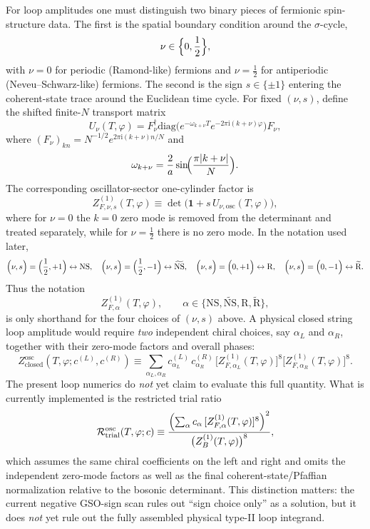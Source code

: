 \documentclass[11pt]{article}
\newcommand{\ii}{\mathrm{i}}
\begin{document}
For loop amplitudes one must distinguish two binary pieces of fermionic
spin-structure data. The first is the spatial boundary condition around the
$\sigma$-cycle,
\[
\nu\in\Bigl\{0,\frac12\Bigr\},
\]
with $\nu=0$ for periodic (Ramond-like) fermions and $\nu=\frac12$ for
antiperiodic (Neveu--Schwarz-like) fermions. The second is the sign
$s\in\{\pm1\}$ entering the coherent-state trace around the Euclidean time
cycle. For fixed $(\nu,s)$, define the shifted finite-$N$ transport matrix
\begin{equation}
U_\nu(T,\varphi)
=
F_\nu^\dagger
\mathrm{diag}\!\bigl(
e^{-\omega_{k+\nu}T}e^{-2\pi\ii(k+\nu)\varphi}
\bigr)
F_\nu,
\label{eq:ferm-spin-transport}
\end{equation}
where $(F_\nu)_{kn}=N^{-1/2}e^{2\pi\ii(k+\nu)n/N}$ and
\[
\omega_{k+\nu}=\frac{2}{a}\sin\!\Bigl(\frac{\pi|k+\nu|}{N}\Bigr).
\]
The corresponding oscillator-sector one-cylinder factor is
\begin{equation}
Z^{(1)}_{F,\nu,s}(T,\varphi)
\equiv
\det\!\bigl(\mathbf{1}+s\,U_{\nu,\mathrm{osc}}(T,\varphi)\bigr),
\label{eq:ferm-spin-sector}
\end{equation}
where for $\nu=0$ the $k=0$ zero mode is removed from the determinant and
treated separately, while for $\nu=\frac12$ there is no zero mode. In the
notation used later,
\[
\Bigl(\nu,s\Bigr)=\Bigl(\frac12,+1\Bigr)\leftrightarrow \mathrm{NS},\quad
\Bigl(\nu,s\Bigr)=\Bigl(\frac12,-1\Bigr)\leftrightarrow \widetilde{\mathrm{NS}},\quad
\Bigl(\nu,s\Bigr)=\Bigl(0,+1\Bigr)\leftrightarrow \mathrm{R},\quad
\Bigl(\nu,s\Bigr)=\Bigl(0,-1\Bigr)\leftrightarrow \widetilde{\mathrm{R}}.
\]
Thus the notation
\[
Z^{(1)}_{F,\alpha}(T,\varphi),
\qquad
\alpha\in\{\mathrm{NS},\widetilde{\mathrm{NS}},\mathrm{R},\widetilde{\mathrm{R}}\},
\]
is only shorthand for the four choices of $(\nu,s)$ above. A physical closed
string loop amplitude would require \emph{two} independent chiral choices,
say $\alpha_L$ and $\alpha_R$, together with their zero-mode factors and
overall phases:
\begin{equation}
Z_{\mathrm{closed}}^{\mathrm{osc}}(T,\varphi;c^{(L)},c^{(R)})
\equiv
\sum_{\alpha_L,\alpha_R}
c^{(L)}_{\alpha_L}\,c^{(R)}_{\alpha_R}\,
\bigl[Z^{(1)}_{F,\alpha_L}(T,\varphi)\bigr]^8
\bigl[Z^{(1)}_{F,\alpha_R}(T,\varphi)\bigr]^8.
\label{eq:ferm-closed-osc}
\end{equation}
The present loop numerics do \emph{not} yet claim to evaluate this full
quantity. What is currently implemented is the restricted trial ratio
\begin{equation}
{\cal R}_{\mathrm{trial}}^{\mathrm{osc}}(T,\varphi;c)
\equiv
\frac{\Bigl(\sum_{\alpha} c_\alpha\,[Z^{(1)}_{F,\alpha}(T,\varphi)]^8\Bigr)^2}
{\bigl(Z_B^{(1)}(T,\varphi)\bigr)^8},
\label{eq:ferm-trial-ratio}
\end{equation}
which assumes the same chiral coefficients on the left and right and omits
the independent zero-mode factors as well as the final coherent-state/Pfaffian
normalization relative to the bosonic determinant. This distinction matters:
the current negative GSO-sign scan rules out ``sign choice only'' as a
solution, but it does \emph{not} yet rule out the fully assembled physical
type-II loop integrand.
\end{document}
